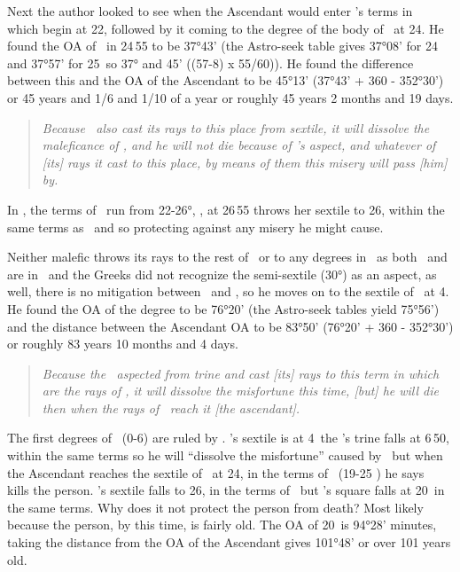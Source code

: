 Next  the author looked to see when the Ascendant would enter \Saturn's terms in \Taurus\, which begin at 22\Taurus, followed by it coming to the degree of the body of \Mars\, at 24\Taurus. He found the OA of \Mars\, in 24\Taurus\,55 to be 37°43' (the Astro-seek table gives 37°08' for 24\Taurus\, and 37°57' for 25\Taurus\, so 37° and 45' ((57-8) x 55/60)). He found the difference between this and the OA of the Ascendant to be 45°13' (37°43' + 360 - 352°30') or  45 years and 1/6 and 1/10 of a year or roughly 45 years 2 months and 19 days. 

\begin{quote}
\textsl{Because  \Venus\, also cast its rays to this place from sextile, it will dissolve the maleficance of \Mars, and he will not die because of \Venus's aspect, and whatever of [its] rays it cast to this place, by means of them this misery will pass [him] by.
}
\end{quote}

In \Taurus, the terms of \Saturn\, run from 22-26°, \Venus, at 26\Pisces\,55 throws her sextile to 26\Taurus, within the same terms as \Mars\, and so protecting against any misery he might cause.

Neither   malefic throws its rays to the rest of \Taurus\, or to any degrees in \Gemini\, as both \Saturn\, and \Mars\, are in \Taurus\, and the Greeks did not recognize the semi-sextile (30°) as an aspect, as well, there is no mitigation between \Taurus\, and \Gemini, so he moves on to the sextile of \Saturn\, at 4. He found the OA of the degree to be 76°20' (the Astro-seek tables yield 75°56') and the distance between the Ascendant OA to be 83°50' (76°20' + 360 - 352°30') or roughly 83 years 10 months and 4 days.
\begin{quote}
\textsl{Because the \Sun\, aspected from trine and cast [its] rays to this term in which are the rays of \Saturn, it will dissolve the misfortune this time, [but] he will die then when the rays of \Mars\, reach it [the ascendant].}
\end{quote}

The first degrees of \Cancer\, (0-6) are ruled by \Mars. \Saturn's sextile is at 4\Cancer\, the \Sun's trine falls at 6\Cancer\,50, within the same terms so he will ``dissolve the misfortune'' caused by \Saturn\, but when the Ascendant reaches the sextile of \Mars\, at 24\Cancer, in the terms of \Jupiter\, (19-25 \Cancer) he says  \Mars\, kills the person. \Venus's sextile falls to 26\Cancer, in the terms of \Saturn\, but \Jupiter's square falls at 20\Cancer\, in the same terms. Why does it not protect the person from death?  Most likely because the person, by this time, is fairly old. The OA of 20\Cancer\, is 94°28' minutes, taking the distance from the OA of the Ascendant gives 101°48' or over 101 years old.

